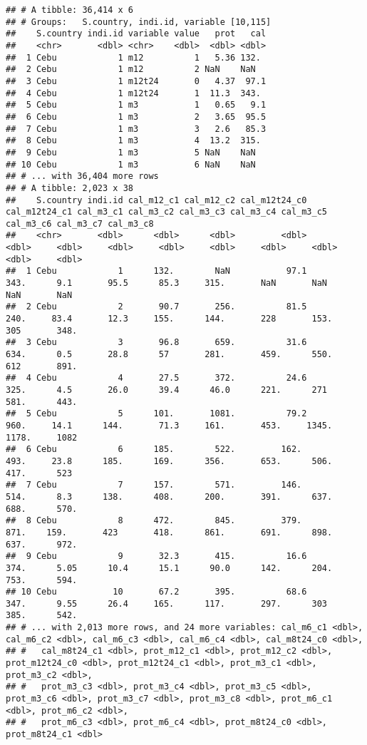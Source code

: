\documentclass[
]{book}
\begin{document}
\begin{verbatim}
## # A tibble: 36,414 x 6
## # Groups:   S.country, indi.id, variable [10,115]
##    S.country indi.id variable value   prot   cal
##    <chr>       <dbl> <chr>    <dbl>  <dbl> <dbl>
##  1 Cebu            1 m12          1   5.36 132. 
##  2 Cebu            1 m12          2 NaN    NaN  
##  3 Cebu            1 m12t24       0   4.37  97.1
##  4 Cebu            1 m12t24       1  11.3  343. 
##  5 Cebu            1 m3           1   0.65   9.1
##  6 Cebu            1 m3           2   3.65  95.5
##  7 Cebu            1 m3           3   2.6   85.3
##  8 Cebu            1 m3           4  13.2  315. 
##  9 Cebu            1 m3           5 NaN    NaN  
## 10 Cebu            1 m3           6 NaN    NaN  
## # ... with 36,404 more rows
## # A tibble: 2,023 x 38
##    S.country indi.id cal_m12_c1 cal_m12_c2 cal_m12t24_c0 cal_m12t24_c1 cal_m3_c1 cal_m3_c2 cal_m3_c3 cal_m3_c4 cal_m3_c5 cal_m3_c6 cal_m3_c7 cal_m3_c8
##    <chr>       <dbl>      <dbl>      <dbl>         <dbl>         <dbl>     <dbl>     <dbl>     <dbl>     <dbl>     <dbl>     <dbl>     <dbl>     <dbl>
##  1 Cebu            1      132.        NaN           97.1          343.      9.1       95.5      85.3     315.       NaN       NaN       NaN       NaN 
##  2 Cebu            2       90.7       256.          81.5          240.     83.4       12.3     155.      144.       228       153.      305       348.
##  3 Cebu            3       96.8       659.          31.6          634.      0.5       28.8      57       281.       459.      550.      612       891.
##  4 Cebu            4       27.5       372.          24.6          325.      4.5       26.0      39.4      46.0      221.      271       581.      443.
##  5 Cebu            5      101.       1081.          79.2          960.     14.1      144.       71.3     161.       453.     1345.     1178.     1082 
##  6 Cebu            6      185.        522.         162.           493.     23.8      185.      169.      356.       653.      506.      417.      523 
##  7 Cebu            7      157.        571.         146.           514.      8.3      138.      408.      200.       391.      637.      688.      570.
##  8 Cebu            8      472.        845.         379.           871.    159.       423       418.      861.       691.      898.      637.      972.
##  9 Cebu            9       32.3       415.          16.6          374.      5.05      10.4      15.1      90.0      142.      204.      753.      594.
## 10 Cebu           10       67.2       395.          68.6          347.      9.55      26.4     165.      117.       297.      303       385.      542.
## # ... with 2,013 more rows, and 24 more variables: cal_m6_c1 <dbl>, cal_m6_c2 <dbl>, cal_m6_c3 <dbl>, cal_m6_c4 <dbl>, cal_m8t24_c0 <dbl>,
## #   cal_m8t24_c1 <dbl>, prot_m12_c1 <dbl>, prot_m12_c2 <dbl>, prot_m12t24_c0 <dbl>, prot_m12t24_c1 <dbl>, prot_m3_c1 <dbl>, prot_m3_c2 <dbl>,
## #   prot_m3_c3 <dbl>, prot_m3_c4 <dbl>, prot_m3_c5 <dbl>, prot_m3_c6 <dbl>, prot_m3_c7 <dbl>, prot_m3_c8 <dbl>, prot_m6_c1 <dbl>, prot_m6_c2 <dbl>,
## #   prot_m6_c3 <dbl>, prot_m6_c4 <dbl>, prot_m8t24_c0 <dbl>, prot_m8t24_c1 <dbl>
\end{verbatim}
\end{document}
